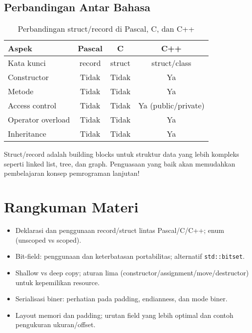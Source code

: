 \documentclass[../main.tex]{subfiles}
\begin{document}
\subsection{Perbandingan Antar Bahasa}

\begin{table}[H]
\centering
\begin{tabular}{|l|c|c|c|}
\hline
\textbf{Aspek} & \textbf{Pascal} & \textbf{C} & \textbf{C++} \\
\hline
Kata kunci & record & struct & struct/class \\
\hline
Constructor & Tidak & Tidak & Ya \\
\hline
Metode & Tidak & Tidak & Ya \\
\hline
Access control & Tidak & Tidak & Ya (public/private) \\
\hline
Operator overload & Tidak & Tidak & Ya \\
\hline
Inheritance & Tidak & Tidak & Ya \\
\hline
\end{tabular}
\caption{Perbandingan struct/record di Pascal, C, dan C++}
\end{table}

Struct/record adalah building blocks untuk struktur data yang lebih kompleks seperti linked list, tree, dan graph. Penguasaan yang baik akan memudahkan pembelajaran konsep pemrograman lanjutan!

\section{Rangkuman Materi}
\begin{itemize}
  \item Deklarasi dan penggunaan record/struct lintas Pascal/C/C++; enum (unscoped vs scoped).
  \item Bit-field: penggunaan dan keterbatasan portabilitas; alternatif \texttt{std::bitset}.
  \item Shallow vs deep copy; aturan lima (constructor/assignment/move/destructor) untuk kepemilikan resource.
  \item Serialisasi biner: perhatian pada padding, endianness, dan mode biner.
  \item Layout memori dan padding; urutan field yang lebih optimal dan contoh pengukuran ukuran/offset.
\end{itemize}
\end{document}
